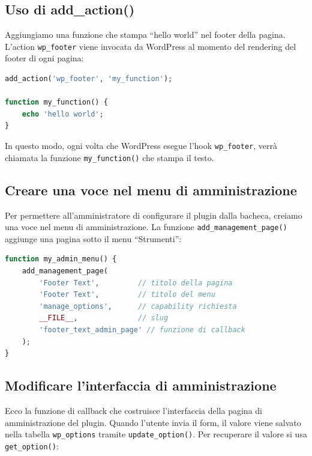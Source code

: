 \subsection{Uso di add\_action()}

Aggiungiamo una funzione che stampa ``hello world'' nel footer della pagina. L'action \texttt{wp\_footer} viene invocata da WordPress al momento del rendering del footer di ogni pagina:

\begin{lstlisting}[language=PHP]
add_action('wp_footer', 'my_function');

function my_function() {
    echo 'hello world';
}
\end{lstlisting}

In questo modo, ogni volta che WordPress esegue l'hook \texttt{wp\_footer}, verrà chiamata la funzione \texttt{my\_function()} che stampa il testo.

\subsection{Creare una voce nel menu di amministrazione}

Per permettere all'amministratore di configurare il plugin dalla bacheca, creiamo una voce nel menu di amministrazione. La funzione \texttt{add\_management\_page()} aggiunge una pagina sotto il menu ``Strumenti'':

\begin{lstlisting}[language=PHP]
function my_admin_menu() {
    add_management_page(
        'Footer Text',         // titolo della pagina
        'Footer Text',         // titolo del menu
        'manage_options',      // capability richiesta
        __FILE__,              // slug
        'footer_text_admin_page' // funzione di callback
    );
}
\end{lstlisting}

\subsection{Modificare l'interfaccia di amministrazione}

Ecco la funzione di callback che costruisce l'interfaccia della pagina di amministrazione del plugin. Quando l'utente invia il form, il valore viene salvato nella tabella \texttt{wp\_options} tramite \texttt{update\_option()}. Per recuperare il valore si usa \texttt{get\_option()}:

